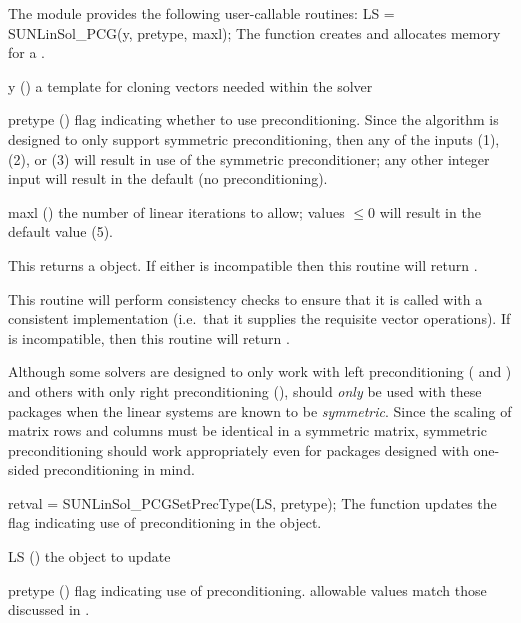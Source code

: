 The module {\sunlinsolpcg} provides the following user-callable routines:
{
  LS = SUNLinSol\_PCG(y, pretype, maxl);
}
{
  The function  creates and allocates memory for
  a {\pcg} .
}
{
  \begin{args}[pretype]
  \item[y] ()
    a template for cloning vectors needed within the solver
  \item[pretype] ()
    flag indicating whether to use preconditioning.
    Since the {\pcg} algorithm is designed to only support symmetric
    preconditioning, then any of the  inputs
     (1),  (2), or  (3)
    will result in use of the symmetric preconditioner;  any other
    integer input will result in the default (no preconditioning).
  \item[maxl] ()
    the number of linear iterations to allow; values $\le0$ will
    result in the default value (5).
  \end{args}
}
{
  This returns a  object.  If either  is
  incompatible then this routine will return .
}
{
  This routine will perform consistency checks to ensure that it is
  called with a consistent {\nvector} implementation (i.e.~that it
  supplies the requisite vector operations).  If  is
  incompatible, then this routine will return .

  Although some {\sundials} solvers are designed to only work
  with left preconditioning ({\ida} and {\idas}) and others with only
  right preconditioning ({\kinsol}), {\pcg} should \emph{only} be used
  with these packages when the linear systems are known to
  be \emph{symmetric}.  Since the scaling of matrix rows and columns
  must be identical in a symmetric matrix, symmetric preconditioning
  should work appropriately even for packages designed with one-sided
  preconditioning in mind.
}
{
  retval = SUNLinSol\_PCGSetPrecType(LS, pretype);
}
{
  The function  updates the flag
  indicating use of preconditioning in the {\sunlinsolpcg} object.
}
{
  \begin{args}[pretype]
  \item[LS] ()
    the {\sunlinsolpcg} object to update
  \item[pretype] ()
    flag indicating use of preconditioning.  allowable values match
    those discussed in .
  \end{args}
}
